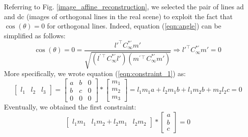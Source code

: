 \documentclass[11pt, oneside]{article}
\begin{document}
Referring to Fig. \ref{image_affine_reconstruction}, we selected the pair of lines ad and dc (images of orthogonal lines in the real scene) to exploit the fact that $\cos(\theta) = 0$ for orthogonal lines. Indeed, equation (\ref{eqn:angle}) can be simplified as follows:
\begin{equation}
	\label{eqn:constraint_1}
	\cos(\theta) = 0 =
	\frac{l{'^\intercal} C^{*'}_\infty m'}{\sqrt{(l^{'\intercal} C^{*'}_\infty l')(m^{'\intercal} C^{*'}_\infty m')}} 
	\Rightarrow
	l{'^\intercal} C^{*'}_\infty m' = 0
\end{equation}
More specifically, we wrote equation (\ref{eqn:constraint_1}) as:
\begin{equation}
	\begin{bmatrix}
		l_1 & l_2 & l_3
	\end{bmatrix}
	=
	\begin{bmatrix}
		a & b & 0 \\ b & c & 0 \\ 0 & 0 & 0
	\end{bmatrix} *
	\begin{bmatrix}
		m_1 \\ m_2 \\ m_3
	\end{bmatrix}
	= l_1 m_1 a + l_2 m_1 b + l_1 m_2 b + m_2 l_2 c = 0
\end{equation}
Eventually, we obtained the first constraint:
\begin{equation}
	\begin{bmatrix}
		l_1 m_1 & l_1 m_2 + l_2 m_1 & l_2 m_2
	\end{bmatrix}
	*
	\begin{bmatrix}
		a \\ b \\ c
	\end{bmatrix}
	= 0
\end{equation}
\end{document}
